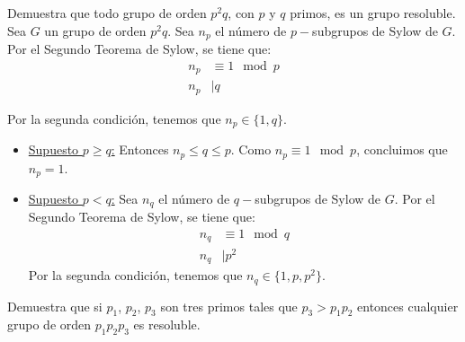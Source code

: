 \begin{ejercicio}
    Demuestra que todo grupo de orden $p^2q$, con $p$ y $q$ primos, es un grupo resoluble.\\


    Sea $G$ un grupo de orden $p^2q$. Sea $n_p$ el número de $p-$subgrupos de Sylow de $G$. Por el Segundo Teorema de Sylow, se tiene que:
    \begin{align*}
        n_p &\equiv 1 \mod p \\
        n_p &\mid q
    \end{align*}

    Por la segunda condición, tenemos que $n_p\in \{1,q\}$. 
    \begin{itemize}
        \item \ul{Supuesto $p\geq q$:} Entonces $n_p\leq q\leq p$. Como $n_p\equiv 1 \mod p$, concluimos que $n_p=1$.
        
        \item \ul{Supuesto $p<q$:} Sea $n_q$ el número de $q-$subgrupos de Sylow de $G$. Por el Segundo Teorema de Sylow, se tiene que:
        \begin{align*}
            n_q &\equiv 1 \mod q \\
            n_q &\mid p^2
        \end{align*}
        Por la segunda condición, tenemos que $n_q\in \{1,p,p^2\}$.\\
    \end{itemize}
    
    
    
\end{ejercicio}

\begin{ejercicio}
    Demuestra que si $p_1$, $p_2$, $p_3$ son tres primos tales que $p_3 > p_1 p_2$ entonces cualquier grupo de orden $p_1 p_2 p_3$ es resoluble.


\end{ejercicio}

